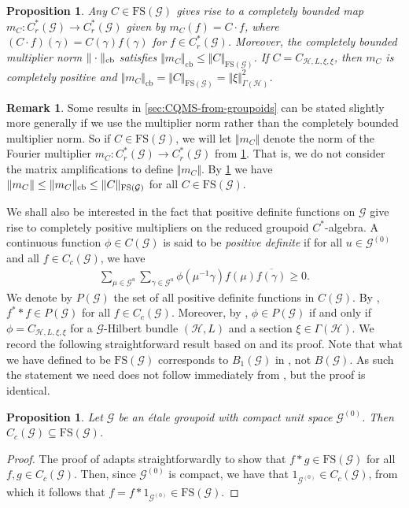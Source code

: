 \documentclass[11pt,a4paper,oneside,final,reqno]{amsart}
\newtheorem{proposition}[lemma]{Proposition}
\theoremstyle{definition}
\newtheorem{remark}[lemma]{Remark}
\newcommand{\G}{\mathcal{G}}
\newcommand{\Go}{\mathcal{G}^{(0)}}
\newcommand{\curlyH}{\mathcal{H}}
\newcommand{\FS}{\mathrm{FS}}
\newcommand{\Cred}{C_{r}^{*}}
\numberwithin{equation}{section}
\begin{document}
	\begin{proposition}\label{prop:FS-yields-cb-maps}
		Any $C \in \FS(\G)$ gives rise to a completely bounded map $m_C \colon \Cred (\G) \to \Cred(\G)$ given by $m_C(f) = C \cdot f$, where $(C \cdot f)(\gamma) = C(\gamma)f(\gamma)$ for $f \in \Cred (\G)$. Moreover, the \emph{completely bounded multiplier norm} $\Vert \cdot \Vert_{\rm cb}$ satisfies $\Vert m_C \Vert_{\mathrm{cb}} \leq \Vert C \Vert_{\FS(\G)}$. If $C = C_{\curlyH, L, \xi, \xi}$, then $m_C$ is completely positive and $\Vert m_C \Vert_{\mathrm{cb}} = \Vert C \Vert_{\FS(\G)} =  \Vert \xi \Vert_{\Gamma(\curlyH)}^2$. 
	\end{proposition}

\begin{remark}\label{remark:multiplier-norm}
	Some results in \cref{sec:CQMS-from-groupoids} can be stated slightly more generally if we use the multiplier norm rather than the completely bounded multiplier norm. So if $C \in \FS(\G)$, we will let $\Vert m_C \Vert$ denote the norm of the Fourier multiplier $m_C \colon \Cred(\G) \to \Cred (\G)$ from \cref{prop:FS-yields-cb-maps}. That is, we do not consider the matrix amplifications to define $\Vert m_C \Vert$. By \cref{prop:FS-yields-cb-maps} we have $\Vert m_C \Vert \leq \Vert m_C \Vert_{\rm cb} \leq \Vert C \Vert_{\FS(\G)}$ for all $C \in \FS(\G)$.  
\end{remark}
	
	We shall also be interested in the fact that positive definite functions on $\G$ give rise to completely positive multipliers on the reduced groupoid $C^*$-algebra. 
	A continuous function $\phi \in C(\G)$ is said to be \emph{positive definite} if for all $u \in \Go$ and all $f \in C_c (\G)$, we have
	\begin{align*}
		\sum_{\mu \in \G^u} \sum_{\gamma \in \G^u} \phi(\mu^{-1}\gamma) f(\mu) \overline{f(\gamma)} \geq 0.
	\end{align*}
	We denote by $P(\G)$ the set of all positive definite functions in $C(\G)$. 
	By \cite[pg. 205-206]{BrownOzawaBook}, $f^* * f \in P(\G)$ for all $f \in C_c(\G)$. 
	Moreover, by \cite[Theorem 1]{PatersonFourierAlgebra2004}, $\phi \in P(\G)$ if and only if $\phi = C_{\curlyH, L, \xi , \xi}$ for a $\G$-Hilbert bundle $(\curlyH , L)$ and a section $\xi \in \Gamma(\curlyH)$. 
	We record the following straightforward result based on \cite[Proposition 3.3]{OtyFourier-Stieltjes}  and its proof. Note that what we have defined to be $\FS(\G)$ corresponds to $B_1(\G)$ in \cite{OtyFourier-Stieltjes}, not $B(\G)$. As such the statement we need does not follow immediately from \cite[Proposition 3.3]{OtyFourier-Stieltjes}, but the proof is identical. 
	\begin{proposition}\label{prop:Cc-is-in-FS}
		Let $\G$ be an \'etale groupoid with compact unit space $\Go$. 
		Then $C_c(\G) \subseteq \FS(\G)$. 
	\end{proposition}
	\begin{proof}
		The proof of \cite[Proposition 3.3]{OtyFourier-Stieltjes} adapts straightforwardly to show that $f * g \in \FS(\G)$ for all $f,g \in C_c(\G)$. Then, since $\Go$ is compact, we have that $1_{\Go} \in C_c(\G)$, from which it follows that $f = f * 1_{\Go} \in \FS(\G)$. 
	\end{proof}
	
\end{document}
